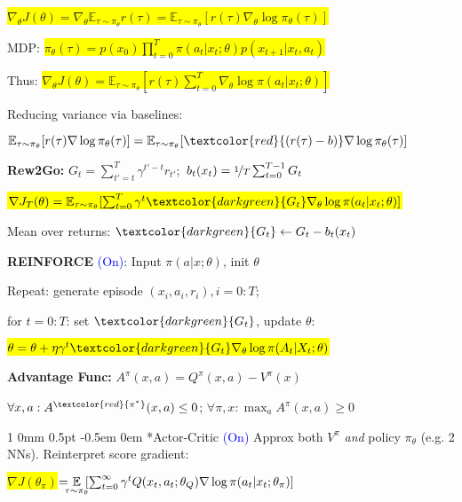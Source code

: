 \documentclass[11pt,landscape,a4paper,fleqn]{article}
\makeatletter
\newcommand*{\rsection}{%
	\@startsection{section}%
	{1}%
	{0mm}%
	{0.5pt}%
	{-0.5em \@plus 0em}
	{\color{myorange}\sffamily\small\bfseries}}
\newcommand{\mhl}[1]{\setlength{\fboxsep}{0pt}\colorbox{yellow}{#1}}
\makeatother
\begin{document}
\begin{multicols*}{4}
	\mhl{$\nabla_\theta J(\theta) = \nabla_\theta \mathbb{E}_{\tau \sim \pi_\theta} r(\tau) = \mathbb{E}_{\tau \sim \pi_\theta} [r(\tau) \nabla_\theta \log \pi_\theta(\tau)]$}

	MDP: \mhl{$\pi_\theta(\tau) = p(x_0) \prod_{t=0}^{T} \pi(a_t | x_t; \theta) p(x_{t+1} | x_t, a_t)$}

	Thus: \mhl{$\nabla_\theta J(\theta) = \mathbb{E}_{\tau \sim \pi_\theta} [r(\tau) \sum_{t=0}^{T} \nabla_\theta \log \pi(a_t | x_t; \theta)]$}

	Reducing variance via baselines:

	\mbox{\fontsize{9.4}{6}\selectfont $\mathbb{E}_{\tau \sim \pi_\theta} [r(\tau) \nabla \log \pi_\theta(\tau)] = \mathbb{E}_{\tau \sim \pi_\theta} [\textcolor{red}{(r(\tau) - b)} \nabla \log \pi_\theta(\tau)]$}

	\textbf{Rew2Go:} \mbox{$G_t = \sum_{t' = t}^{T} \gamma^{t' - t} r_{t'}$; $b_t(x_t) = \nicefrac{1}{T} \sum_{t=0}^{T-1} G_t$}

	\mhl{$\nabla J_T(\theta) = \mathbb{E}_{\tau \sim \pi_\theta} [\sum_{t=0}^T \gamma^t \textcolor{darkgreen}{G_t} \nabla_\theta \log \pi(a_t | x_t; \theta)]$}

	Mean over returns: \textcolor{darkgreen}{$\textcolor{darkgreen}{G_t} \leftarrow G_t - b_t(x_t)$}


	\textbf{REINFORCE} \textcolor{blue}{(On)}: Input $\pi(a | x; \theta)$, init $\theta$

	Repeat: generate episode $(x_i, a_i, r_i), i=0:T$;

	for $t=0:T$: set $\textcolor{darkgreen}{G_t}$, update $\theta$:

	\mhl{$\theta = \theta + \eta \gamma^t \textcolor{darkgreen}{G_t} \nabla_\theta \log \pi(A_t | X_t; \theta)$}




	\textbf{Advantage Func:} {\fontsize{9.8}{6}\selectfont $A^\pi(x,a) = Q^\pi(x,a) - V^\pi(x)$}

	$\forall x,a: A^{\textcolor{red}{\pi^*}}(x,a) \leq 0$; $\forall \pi,x: \max_a A^\pi(x,a) \geq 0$



	\rsection*{Actor-Critic} \textcolor{blue}{(On)} Approx both $V^\pi$ \textit{and} policy $\pi_\theta$ (e.g. 2 NNs). Reinterpret score gradient:

	\mhl{$\nabla J(\theta_\pi)$}$= \hspace*{-2mm} \underset{\tau \sim \pi_\theta}{\mathbb{E}} \hspace*{-1mm} [\sum_{t=0}^\infty \gamma^t Q(x_t, a_t; \theta_Q) \nabla \log \pi(a_t | x_t; \theta_\pi)]$


\end{multicols*}
\end{document}
